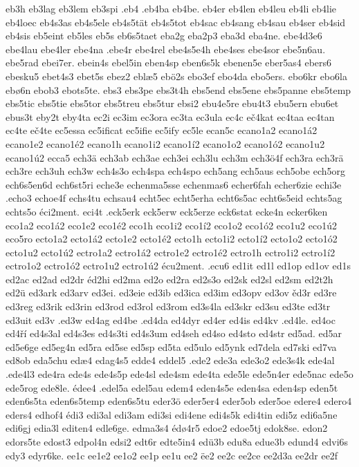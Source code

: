eb3h
eb3lag
eb3lem
eb3spi
.eb4
.eb4ba
eb4be.
eb4er
eb4len
eb4leu
eb4li
eb4lie
eb4loec
eb4s3as
eb4s5ele
eb4s5tät
eb4s5tot
eb4sac
eb4sang
eb4sau
eb4ser
eb4sid
eb4sis
eb5eint
eb5les
eb5s
eb6s5taet
eba2g
eba2p3
eba3d
eba4ne.
ebe4d3e6
ebe4lau
ebe4ler
ebe4na
.ebe4r
ebe4rel
ebe4s5e4h
ebe4ses
ebe4sor
ebe5n6au.
ebe5rad
ebei7er.
ebein4s
ebel5in
eben4sp
eben6s5k
ebenen5e
eber5as4
ebers6
ebesku5
ebet4s3
ebet5s
ebez2
eblæ5
ebö2s
ebo3ef
ebo4da
ebo5ers.
ebo6kr
ebo6la
ebø6n
ebob3
ebots5te.
ebs3
ebs3pe
ebs3t4h
ebs5end
ebs5ene
ebs5panne
ebs5temp
ebs5tic
ebs5tie
ebs5tor
ebs5treu
ebs5tur
ebsi2
ebu4e5re
ebu4t3
ebu5ern
ebu6et
ebus3t
eby2t
eby4ta
ec2i
ec3im
ec3ora
ec3ta
ec3ula
ec4c
eč4kat
ec4taa
ec4tan
ec4te
eč4te
ec5essa
ec5ificat
ec5ifie
ec5ify
ec5le
ecan5c
ecano1a2
ecano1á2
ecano1e2
ecano1é2
ecano1h
ecano1i2
ecano1í2
ecano1o2
ecano1ó2
ecano1u2
ecano1ú2
ecca5
ech3ä
ech3ab
ech3ae
ech3ei
ech3lu
ech3m
ech3ö4f
ech3ra
ech3rä
ech3re
ech3uh
ech3w
ech4s3o
ech4spa
ech4spo
ech5ang
ech5aus
ech5obe
ech5org
ech6s5en6d
ech6st5ri
eche3e
echenma5sse
echenmas6
echer6fah
echer6zie
echi3e
.echo3
echoe4f
echs4tu
echsau4
echt5ec
echt5erha
echt6s5ac
echt6s5eid
echts5ag
echts5o
éci2ment.
eci4t
.eck5erk
eck5erw
eck5erze
eck6stat
ecke4n
ecker6ken
eco1a2
eco1á2
eco1e2
eco1é2
eco1h
eco1i2
eco1í2
eco1o2
eco1ó2
eco1u2
eco1ú2
eco5ro
ecto1a2
ecto1á2
ecto1e2
ecto1é2
ecto1h
ecto1i2
ecto1í2
ecto1o2
ecto1ó2
ecto1u2
ecto1ú2
ectro1a2
ectro1á2
ectro1e2
ectro1é2
ectro1h
ectro1i2
ectro1í2
ectro1o2
ectro1ó2
ectro1u2
ectro1ú2
écu2ment.
.ecu6
ed1it
ed1l
ed1op
ed1ov
ed1s
ed2ac
ed2ad
ed2dr
éd2hi
ed2ma
ed2o
ed2ra
ed2s3o
ed2sk
ed2sl
ed2sm
ed2t2h
ed2ü
ed3ark
ed3arv
ed3ei.
ed3eie
ed3ib
ed3ica
ed3im
ed3opv
ed3ov
ěd3r
ed3re
ed3reg
ed3rik
ed3rin
ed3rod
ed3rol
ed3rom
ed3s4la
ed3skr
ed3su
ed3te
ed3tr
ed3uit
ed3v
.ed3w
ed4ag
ed4be
.ed4da
ed4dyr
ed4er
ed4is
ed4kv
.ed4le.
ed4oc
ed4ří
ed4s3al
ed4s3es
ed4s3ti
ed4s3um
ed4seh
ed4so
ed4sto
ed4str
ed5ad.
ed5ar
ed5e6ge
ed5eg4n
ed5ra
ed5se
ed5sp
ed5ta
ed5ulo
ed5ynk
ed7dela
ed7ski
ed7va
ed8ob
eda5chu
edæ4
edag4s5
edde4
eddel5
.ede2
ede3a
ede3o2
ede3s4k
ede4al
.ede4l3
ede4ra
ede4s
ede4s5p
ede4sl
ede4sm
ede4ta
ede5le
ede5n4er
ede5nac
ede5o
ede5rog
ede8le.
édee4
.edel5a
edel5au
edem4
eden4s5e
eden4sa
eden4sp
eden5t
eden6s5ta
eden6s5temp
eden6s5tu
eder3ö
eder5er4
eder5ob
eder5oe
edere4
edero4
eders4
edhof4
édi3
edi3al
edi3am
edi3si
edi4ene
edi4s5k
edi4tin
edi5z
edi6a5ne
edi6gj
edia3l
editen4
edle6ge.
edma3s4
édø4r5
edoe2
edoe5tj
edok8se.
edon2
edors5te
edost3
edpol4n
edsi2
edt6r
edte5in4
edü3b
edu8a
edue3b
edund4
edvi6s
edy3
edyr6ke.
ee1c
ee1e2
ee1o2
ee1p
ee1u
ee2
ëe2
ee2c
ee2ce
ee2d3a
ee2dr
ee2f
